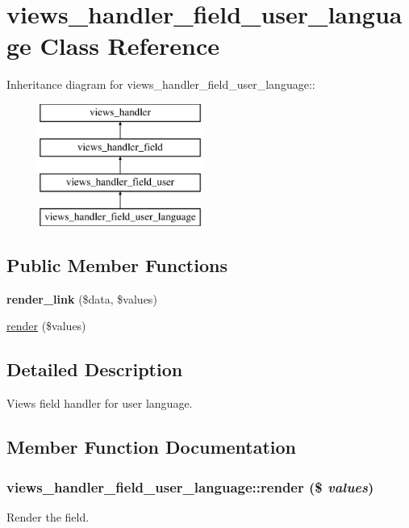 \hypertarget{classviews__handler__field__user__language}{
\section{views\_\-handler\_\-field\_\-user\_\-language Class Reference}
\label{classviews__handler__field__user__language}
}
Inheritance diagram for views\_\-handler\_\-field\_\-user\_\-language::\begin{figure}[H]
\begin{center}
\leavevmode
\includegraphics[height=4cm]{classviews__handler__field__user__language}
\end{center}
\end{figure}
\subsection*{Public Member Functions}
\begin{DoxyCompactItemize}
\item 
\hypertarget{classviews__handler__field__user__language_af3c96bb1e72c2d8c4afe45e6132977c5}{
{\bfseries render\_\-link} (\$data, \$values)}
\label{classviews__handler__field__user__language_af3c96bb1e72c2d8c4afe45e6132977c5}

\item 
\hyperlink{classviews__handler__field__user__language_aaa89fbb3f01a1dd279f3195eaa837693}{render} (\$values)
\end{DoxyCompactItemize}


\subsection{Detailed Description}
Views field handler for user language. 

\subsection{Member Function Documentation}
\hypertarget{classviews__handler__field__user__language_aaa89fbb3f01a1dd279f3195eaa837693}{
\subsubsection[{render}]{\setlength{\rightskip}{0pt plus 5cm}views\_\-handler\_\-field\_\-user\_\-language::render (\$ {\em values})}}
\label{classviews__handler__field__user__language_aaa89fbb3f01a1dd279f3195eaa837693}
Render the field.



